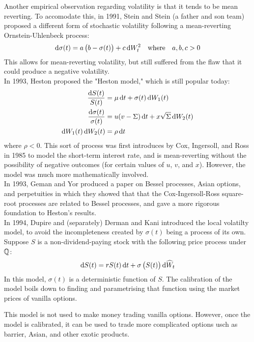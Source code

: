 \documentclass[11pt]{article}
\begin{document}
Another empirical observation regarding volatility is that it tends to be mean reverting. To accomodate this, in 1991, Stein and Stein (a father and son team) proposed a different form of stochastic volatility following a mean-reverting Ornstein-Uhlenbeck process:
$$ \dif \sigma(t) = a\left(b-\sigma(t)\right) + c \dif W^2_t \quad \text{where} \quad a,b,c > 0$$
This allows for mean-reverting volatility, but still suffered from the flaw that it could produce a negative volatility. \\

In 1993, Heston proposed the "Heston model," which is still popular today:
\begin{align*}
\frac{\dif S(t)}{S(t)} &= \mu \dif t + \sigma(t) \dif W_1(t) \\
\frac{\dif \sigma(t)}{\sigma(t)} &= u (v - \Sigma)\dif t + x \sqrt{\Sigma}\dif W_2(t) \\
\dif W_1(t) \dif W_2(t) &= \rho \dif t
\end{align*}
where $\rho < 0$. This sort of process was first introduces by Cox, Ingersoll, and Ross in 1985 to model the short-term interest rate, and is mean-reverting without the possibility of negative outcomes (for certain values of $u$, $v$, and $x$). However, the model was much more mathematically involved. \\

In 1993, Geman and Yor produced a paper on Bessel processes, Asian options, and perpetuities in which they showed that that the Cox-Ingersoll-Ross square-root processes are related to Bessel processes, and gave a more rigorous foundation to Heston's results. \\

In 1994, Dupire and (separately) Derman and Kani introduced the local volatilty model, to avoid the incompleteness created by $\sigma(t)$ being a process of its own. Suppose $S$ is a non-dividend-paying stock with the following price process under $\operatorname{\mathbb Q}$:
$$\dif S(t) = r S(t) \dif t + \sigma \left( S(t) \right) \dif \widehat{W}_t$$
In this model, $\sigma(t)$ is a deterministic function of $S$. The calibration of the model boils down to finding and parametrising that function using the market prices of vanilla options.

\begin{remark}
This model is not used to make money trading vanilla options. However, once the model is calibrated, it can be used to trade more complicated options usch as barrier, Asian, and other exotic products.
\end{remark}
\end{document}

